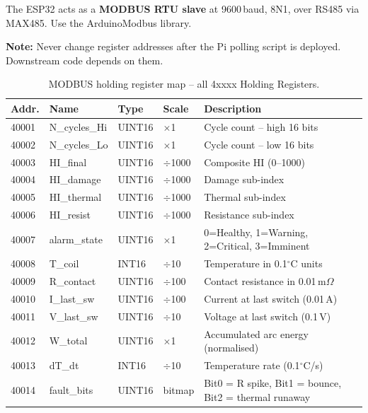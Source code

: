 \documentclass[12pt,a4paper]{article}
\newenvironment{notebox}{%
  \begin{mdframed}[backgroundcolor=notebg,linecolor=noteln,linewidth=1.5pt,
    innerleftmargin=9pt,innerrightmargin=9pt,innertopmargin=5pt,innerbottommargin=5pt]
  \textbf{\color{noteln}Note: }}{\end{mdframed}}
\begin{document}
The ESP32 acts as a \textbf{MODBUS RTU slave} at 9600\,baud, 8N1, over RS485 via MAX485.
Use the ArduinoModbus library.

\begin{notebox}
Never change register addresses after the Pi polling script is deployed. Downstream code depends on them.
\end{notebox}

\begin{table}[H]
\centering
\small
\begin{tabularx}{\textwidth}{llllX}
\toprule
\textbf{Addr.} & \textbf{Name} & \textbf{Type} & \textbf{Scale} & \textbf{Description} \\
\midrule
40001 & N\_cycles\_Hi  & UINT16 & $\times$1    & Cycle count -- high 16 bits \\
40002 & N\_cycles\_Lo  & UINT16 & $\times$1    & Cycle count -- low 16 bits \\
40003 & HI\_final      & UINT16 & $\div$1000   & Composite HI (0--1000) \\
40004 & HI\_damage     & UINT16 & $\div$1000   & Damage sub-index \\
40005 & HI\_thermal    & UINT16 & $\div$1000   & Thermal sub-index \\
40006 & HI\_resist     & UINT16 & $\div$1000   & Resistance sub-index \\
40007 & alarm\_state   & UINT16 & $\times$1    & 0=Healthy, 1=Warning, 2=Critical, 3=Imminent \\
40008 & T\_coil        & INT16  & $\div$10     & Temperature in 0.1$^\circ$C units \\
40009 & R\_contact     & UINT16 & $\div$100    & Contact resistance in 0.01\,m$\Omega$ \\
40010 & I\_last\_sw    & UINT16 & $\div$100    & Current at last switch (0.01\,A) \\
40011 & V\_last\_sw    & UINT16 & $\div$10     & Voltage at last switch (0.1\,V) \\
40012 & W\_total       & UINT16 & $\times$1    & Accumulated arc energy (normalised) \\
40013 & dT\_dt         & INT16  & $\div$10     & Temperature rate (0.1$^\circ$C/s) \\
40014 & fault\_bits    & UINT16 & bitmap       & Bit0 = R spike, Bit1 = bounce, Bit2 = thermal runaway \\
\bottomrule
\end{tabularx}
\caption{MODBUS holding register map -- all 4xxxx Holding Registers.}
\end{table}
\end{document}

